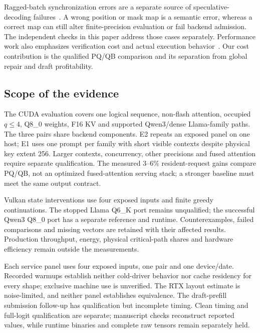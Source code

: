Ragged-batch synchronization errors are a separate source of speculative-decoding failures~\cite{forensics}. A wrong position or mask map is a semantic error, whereas a correct map can still alter finite-precision evaluation or fail backend admission. The independent checks in this paper address those cases separately. Performance work also emphasizes verification cost and actual execution behavior~\cite{illusion,lossless}. Our cost contribution is the qualified PQ/QB comparison and its separation from global repair and draft profitability.

\subsection{Scope of the evidence}
The CUDA evaluation covers one logical sequence, non-flash attention, occupied $q\leq4$, Q8\_0 weights, F16 KV and supported Qwen3/dense Llama-family paths. The three pairs share backend components. E2 repeats an exposed panel on one host; E1 uses one prompt per family with short visible contexts despite physical key extent 256. Larger contexts, concurrency, other precisions and fused attention require separate qualification. The measured 3--6\% resident-request gains compare PQ/QB, not an optimized fused-attention serving stack; a stronger baseline must meet the same output contract.

Vulkan state interventions use four exposed inputs and finite greedy continuations. The stopped Llama Q6\_K port remains unqualified; the successful Qwen3 Q8\_0 port has a separate reference and runtime. Counterexamples, failed comparisons and missing vectors are retained with their affected results. Production throughput, energy, physical critical-path shares and hardware efficiency remain outside the measurements.

Each service panel uses four exposed inputs, one pair and one device/date. Recorded warmups establish neither cold-driver behavior nor cache residency for every shape; exclusive machine use is unverified. The RTX layout estimate is noise-limited, and neither panel establishes equivalence. The draft-prefill submission follow-up has qualification but incomplete timing. Clean timing and full-logit qualification are separate; manuscript checks reconstruct reported values, while runtime binaries and complete raw tensors remain separately held.
